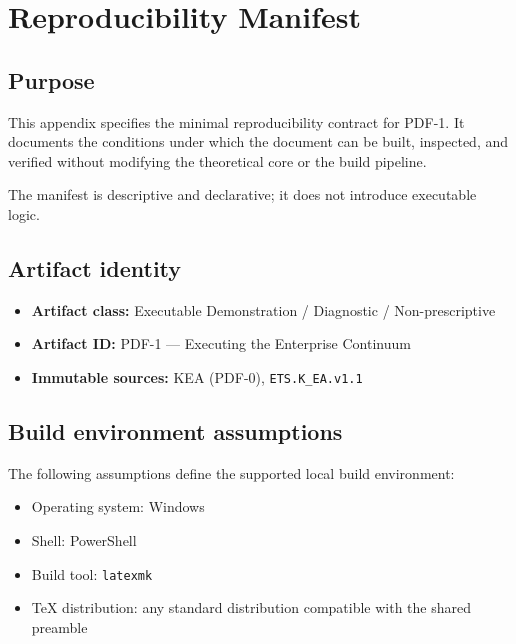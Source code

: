 
\section{Reproducibility Manifest}
\label{appx:repro-manifest}

\subsection{Purpose}
This appendix specifies the minimal reproducibility contract for PDF-1.
It documents the conditions under which the document can be built, inspected,
and verified without modifying the theoretical core or the build pipeline.

The manifest is descriptive and declarative; it does not introduce executable logic.

\subsection{Artifact identity}
\begin{itemize}
  \item \textbf{Artifact class:} Executable Demonstration / Diagnostic / Non-prescriptive
  \item \textbf{Artifact ID:} PDF-1 — Executing the Enterprise Continuum
  \item \textbf{Immutable sources:} KEA (PDF-0), \texttt{ETS.K\_EA.v1.1}
\end{itemize}

\subsection{Build environment assumptions}
The following assumptions define the supported local build environment:
\begin{itemize}
  \item Operating system: Windows
  \item Shell: PowerShell
  \item Build tool: \texttt{latexmk}
  \item TeX distribution: any standard distribution compatible with the shared preamble
\end{itemize}

